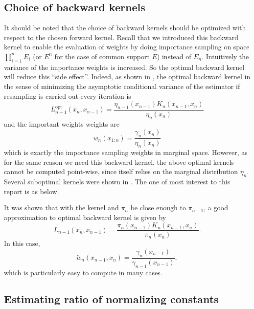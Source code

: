 \subsection{Choice of backward kernels}
\label{sub:Choice of backward kernels}

It should be noted that the choice of backward kernels should be optimized
with respect to the chosen forward kernel. Recall that we introduced this
backward kernel to enable the evaluation of weights by doing importance
sampling on space $\prod_{i=1}^n E_i$ (or $E^n$ for the case of common support
$E$) instead of $E_n$. Intuitively the variance of the importance weights is
increased. So the optimal backward kernel will reduce this ``side effect''.
Indeed, as shown in \textcite{DelMoral2006}, the optimal backward kernel in
the sense of minimizing the asymptotic conditional variance of the estimator
if resampling is carried out every iteration is
\begin{equation}
  L_{n-1}^{\mathrm{opt}}(x_n,x_{n-1})
  = \frac{\eta_{n-1}(x_{n-1})K_n(x_{n-1},x_n)}{\eta_n(x_n)}
\end{equation}
and the important weights weights are
\begin{equation}
  w_n(x_{1:n}) = \frac{\gamma_n(x_n)}{\eta_n(x_n)}
\end{equation}
which is exactly the importance sampling weights in marginal space. However,
as for the same reason we need this backward kernel, the above optimal kernels
cannot be computed point-wise, since itself relies on the marginal
distribution $\eta_n$. Several suboptimal kernels were shown in
\textcite{DelMoral2006}. The one of most interest to this report is as below.

It was shown that with the \mcmc kernel and $\pi_n$ be close enough to
$\pi_{n-1}$, a good approximation to optimal backward kernel is given by
\begin{equation}
  L_{n-1}(x_n,x_{n-1})
  = \frac{\pi_n(x_{n-1})K_n(x_{n-1},x_n)}{\pi_n(x_n)}.
\end{equation}
In this case,
\begin{equation}
  \tilde{w}_n(x_{n-1},x_n)
  = \frac{\gamma_n(x_{n-1})}{\gamma_{n-1}(x_{n-1})},
\end{equation}
which is particularly easy to compute in many cases.

\subsection{Estimating ratio of normalizing constants}
\label{sub:Estimating ratio of normalizing constants}

